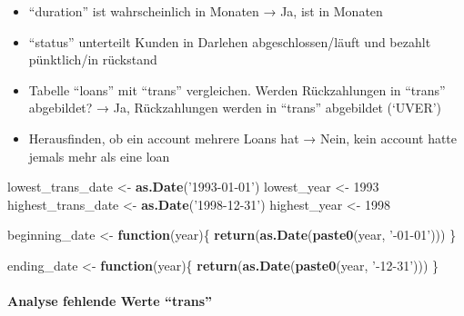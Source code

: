 \documentclass[]{article}
\newenvironment{Shaded}{\begin{snugshade}}{\end{snugshade}}
\newcommand{\ControlFlowTok}[1]{\textcolor[rgb]{0.13,0.29,0.53}{\textbf{#1}}}
\newcommand{\DecValTok}[1]{\textcolor[rgb]{0.00,0.00,0.81}{#1}}
\newcommand{\KeywordTok}[1]{\textcolor[rgb]{0.13,0.29,0.53}{\textbf{#1}}}
\newcommand{\NormalTok}[1]{#1}
\newcommand{\StringTok}[1]{\textcolor[rgb]{0.31,0.60,0.02}{#1}}
\let\oldparagraph\paragraph
\renewcommand{\paragraph}[1]{\oldparagraph{#1}\mbox{}}
\begin{document}
\begin{itemize}
\item
  ``duration'' ist wahrscheinlich in Monaten → Ja, ist in Monaten
\item
  ``status'' unterteilt Kunden in Darlehen abgeschlossen/läuft und
  bezahlt pünktlich/in rückstand
\item
  Tabelle ``loans'' mit ``trans'' vergleichen. Werden Rückzahlungen in
  ``trans'' abgebildet? → Ja, Rückzahlungen werden in ``trans''
  abgebildet (`UVER')
\item
  Herausfinden, ob ein account mehrere Loans hat → Nein, kein account
  hatte jemals mehr als eine loan
\end{itemize}

\begin{Shaded}
\begin{Highlighting}[]
\NormalTok{lowest_trans_date <-}\StringTok{ }\KeywordTok{as.Date}\NormalTok{(}\StringTok{'1993-01-01'}\NormalTok{)}
\NormalTok{lowest_year <-}\StringTok{ }\DecValTok{1993}
\NormalTok{highest_trans_date <-}\StringTok{ }\KeywordTok{as.Date}\NormalTok{(}\StringTok{'1998-12-31'}\NormalTok{)}
\NormalTok{highest_year <-}\StringTok{ }\DecValTok{1998}

\NormalTok{beginning_date <-}\StringTok{ }\ControlFlowTok{function}\NormalTok{(year)\{}
  \KeywordTok{return}\NormalTok{(}\KeywordTok{as.Date}\NormalTok{(}\KeywordTok{paste0}\NormalTok{(year, }\StringTok{'-01-01'}\NormalTok{)))}
\NormalTok{\}}

\NormalTok{ending_date <-}\StringTok{ }\ControlFlowTok{function}\NormalTok{(year)\{}
  \KeywordTok{return}\NormalTok{(}\KeywordTok{as.Date}\NormalTok{(}\KeywordTok{paste0}\NormalTok{(year, }\StringTok{'-12-31'}\NormalTok{)))}
\NormalTok{\}}
\end{Highlighting}
\end{Shaded}

\hypertarget{analyse-fehlende-werte-trans}{%
\paragraph{Analyse fehlende Werte
``trans''}\label{analyse-fehlende-werte-trans}}
\end{document}

